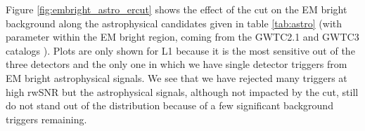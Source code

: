 Figure \ref{fig:embright_astro_ercut} shows the effect of the cut on the EM bright background along the astrophysical candidates given in table \ref{tab:astro} (with parameter within the EM bright region, coming from the GWTC2.1 \cite{gwtc2.1} and GWTC3 catalogs \cite{gwtc3}).
Plots are only shown for L1 because it is the most sensitive out of the three detectors and the only one in which we have single detector triggers from EM bright astrophysical signals.
We see that we have rejected many triggers at high rwSNR but the astrophysical signals, although not impacted by the cut, still do not stand out of the distribution because of a few significant background triggers remaining.

